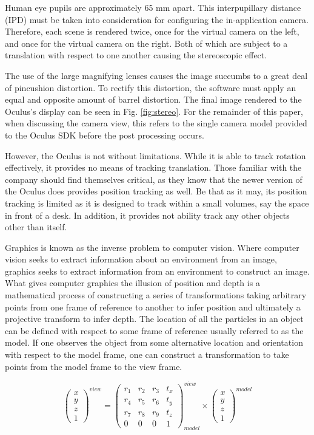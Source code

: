 Human eye pupils are approximately 65 mm apart.  This interpupillary distance
(IPD) must be taken into consideration for configuring the in-application
camera. Therefore, each scene is rendered twice, once for the virtual camera
on the left, and once for the virtual camera on the right. Both of which are
subject to a translation with respect to one another causing the stereoscopic
effect. 

The use of the large magnifying lenses causes the image succumbs to a great
deal of pincushion distortion. To rectify this distortion, the software must
apply an equal and opposite amount of barrel distortion. The final image
rendered to the Oculus's display can be seen in Fig. \ref{fig:stereo}. For the
remainder of this paper, when discussing the camera view, this refers to the
single camera model provided to the Oculus SDK before the post processing
occurs. 

However, the Oculus is not without limitations. While it is able to track
rotation effectively, it provides no means of tracking translation. Those
familiar with the company should find themselves critical, as they know that
the newer version of the Oculus does provides position tracking as well. Be
that as it may, its position tracking is limited as it is designed to track
within a small volumes, say the space in front of a desk. In addition, it
provides not ability track any other objects other than itself.

Graphics is known as the inverse problem to computer vision. Where computer
vision seeks to extract information about an environment from an image,
graphics seeks to extract information from an environment to construct an
image. What gives computer graphics the illusion of position and depth is a
mathematical process of constructing a series of transformations taking
arbitrary points from one frame of reference to another to infer position and
ultimately a projective transform to infer depth. The location of all the
particles in an object can be defined with respect to some frame of reference
usually referred to as the model. If one observes the object from some
alternative location and orientation with respect to the model frame, one can
construct a transformation to take points from the model frame to the view
frame.

\[
\begin{pmatrix} x \\ y \\ z \\ 1 \end{pmatrix}^{view} = 
    \begin{pmatrix}
        r_{1} & r_{2} & r_{3} & t_{x} \\
        r_{4} & r_{5} & r_{6} & t_{y} \\
        r_{7} & r_{8} & r_{9} & t_{z} \\
        0 & 0 & 0 & 1
    \end{pmatrix}^{view}_{model}
    \times
\begin{pmatrix} x \\ y \\ z \\ 1 \end{pmatrix}^{model}
\]



